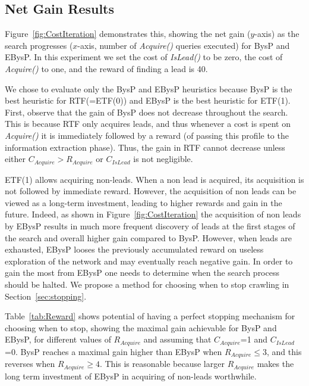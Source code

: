 \documentclass[journal]{IEEEtran}
\newcommand{\islead}[1]{{\em IsLead(#1)}}
\newcommand{\acquire}[1]{{\em Acquire(#1)}}
\begin{document}
\subsection{Net Gain Results}
\label{sec:netGainResults}
Figure~\ref{fig:CostIteration} demonstrates this, showing the net gain ($y$-axis) as the search progresses ($x$-axis, number of \acquire{} queries executed) for BysP and EBysP. In this experiment we set the cost of \islead{} to be zero, the cost of \acquire{} to one, and the reward of finding a lead is 40.

We chose to evaluate only the BysP and EBysP heuristics because BysP is the best heuristic for RTF(=ETF(0)) and EBysP is the best heuristic for ETF(1). First, observe that the gain of BysP does not decrease throughout the search. This is because RTF only acquires leads, and thus whenever a cost is spent on \acquire{} it is immediately followed by a reward (of passing this profile to the information extraction phase). Thus, the gain in RTF cannot decrease unless either $C_{Acquire} > R_{Acquire}$ or $C_{IsLead}$ is not negligible.



ETF(1) allows acquiring non-leads. When a non lead is acquired, its acquisition
is not followed by immediate reward. However, the acquisition of non leads can
be viewed as a long-term investment, leading to higher rewards and gain in the
future. Indeed, as shown in Figure~\ref{fig:CostIteration} the acquisition of
non leads by EBysP results in much more frequent discovery of leads at the
first stages of the search and overall higher gain compared to BysP.
However, when leads are exhausted, EBysP looses the previously accumulated
reward on useless exploration of the network and may eventually reach negative
gain. In order to gain the most from EBysP one needs to determine when the
search process should be halted. We propose a method for choosing when to stop crawling in Section~\ref{sec:stopping}. 

Table~\ref{tab:Reward} shows potential of having a perfect stopping mechanism for choosing when to stop, showing the maximal gain achievable for BysP and EBysP, for different values of $R_{Acquire}$ and assuming that $C_{Acquire}$=1 and $C_{IsLead}$=0. BysP reaches a maximal gain higher than EBysP when \(R_{Acquire} \leq 3 \), and this reverses when $R_{Acquire}\geq 4$. This is reasonable because larger $R_{Acquire}$ makes the long term investment of EBysP in acquiring of non-leads worthwhile.
\end{document}
